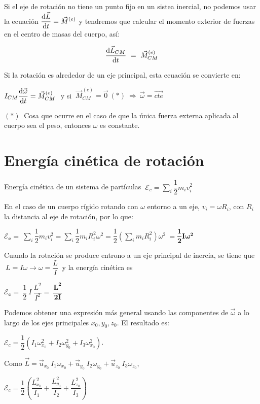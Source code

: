 Si el eje de rotación no tiene un punto fijo en un sistea inercial, no podemos usar la ecuación $\displaystyle \dv{\vec L}{t}=\vec M^{(e)}$ y tendremos que calcular el momento exterior de fuerzas en el centro de masas del cuerpo, así:

$$ \displaystyle \dv{\vec L_{CM}}{t} \ = \ \vec M_{CM}^{(e)} $$

Si la rotación es alrededor de un eje principal, esta ecuación se convierte en:

$ I_{CM}\displaystyle \dv{\vec \omega}{t}=\vec M_{CM}^{(e)}\ $ y si $\ \vec M_{CM}^{(e)}=\vec 0 \ (*)\ \Rightarrow \ \vec \omega=\overrightarrow{cte} $

$(*)\ $ Cosa que ocurre en el caso de que la única fuerza externa aplicada al cuerpo sea el peso, entonces $\omega$ es constante.

\section{Energía cinética de rotación}

Energía cinética de un sistema de partículas $\ \displaystyle \mathcal E_c=\sum_i \dfrac 1 2 m_i v_i^2$

En el caso de un cuerpo rígido rotando con $\omega$ entorno a un eje, $v_i=\omega R_i$, con $R_i$ la distancia al eje de rotación, por lo que:

$\displaystyle \boldsymbol{ \mathcal E_c=} \ \sum_i \dfrac 1 2 m_i v_i^2=\sum_i \dfrac 1 2 m_i R_i^2 \omega^2 =\dfrac 1 2 \left( \sum_i m_i R_i^2 \right) \omega^2 \ \boldsymbol{ =\dfrac 1 2 I \omega^2 }$

Cuando la rotación se produce entrono a un eje principal de inercia, se tiene que $\ L=I\omega \to \omega=\dfrac L I \ $ y la energía cinética es

$\boldsymbol{ \mathcal E_c=}\  \dfrac 1 2 \  I \   \dfrac {L^2} {I^2} = \ \boldsymbol{ \dfrac{L^2}{2I}}$

Podemos obtener una expresión más general usando las componentes de $\vec \omega$ a lo largo de los ejes principales $x_0, y_0, z_0$. El resultado es:

$\mathcal E_c=\dfrac 1 2 \left( I_1 \omega^2_{x_0}+I_2 \omega^2_{y_0}+I_3 \omega^2_{x_0}\right)$.

Como $\vec L=\vec u_{x_0} \ I_1 \omega_{x_0}+\vec u_{y_0} \ I_2 \omega_{y_0} +\vec u_{z_0} \ I_3 \omega_{z_0}$,

$\mathcal E_c= \dfrac 1 2 \left(  \dfrac{L^2_{x_0}}{I_1}+  \dfrac{L^2_{y_0}}{I_2}+  \dfrac{L^2_{z_0}}{I_3} \right)$

